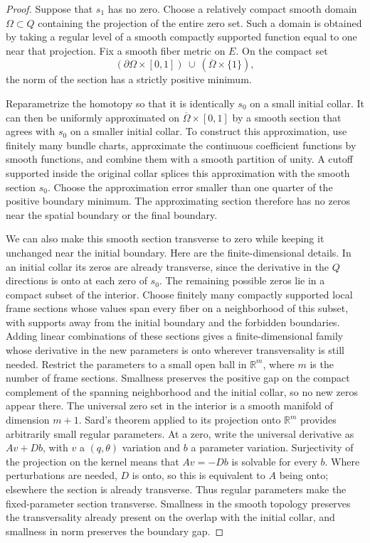 \begin{proof}
Suppose that $s_1$ has no zero.  Choose a relatively compact smooth
domain $\Omega\subset Q$ containing the projection of the entire zero
set.  Such a domain is obtained by taking a regular level of a smooth
compactly supported function equal to one near that projection.
Fix a smooth fiber metric on $E$.  On the compact set
\[
 (\partial\Omega\times[0,1])
 \ \cup\ (\overline\Omega\times\{1\}),
\]
the norm of the section has a strictly positive minimum.

Reparametrize the homotopy so that it is identically $s_0$ on a small
initial collar.  It can then be uniformly approximated on
$\overline\Omega\times[0,1]$ by a smooth section that agrees with $s_0$
on a smaller initial collar.  To construct this approximation, use
finitely many bundle charts, approximate the continuous coefficient
functions by smooth functions, and combine them with a smooth
partition of unity.  A cutoff supported inside the original collar
splices this approximation with the smooth section $s_0$.  Choose the
approximation error smaller than one quarter of the positive boundary
minimum.  The approximating section therefore has no zeros near the
spatial boundary or the final boundary.

We can also make this smooth section transverse to zero while keeping
it unchanged near the initial boundary.  Here are the finite-dimensional
details.  In an initial collar its zeros are already transverse, since
the derivative in the $Q$ directions is onto at each zero of $s_0$.
The remaining possible zeros lie in a compact subset of the interior.
Choose finitely many compactly supported local frame sections whose
values span every fiber on a neighborhood of this subset, with supports
away from the initial boundary and the forbidden boundaries.  Adding
linear combinations of these sections gives a finite-dimensional
family whose derivative in the new parameters is onto wherever
transversality is still needed. Restrict the parameters to a small open
ball in $\mathbb R^m$, where $m$ is the number of frame sections.
Smallness preserves the positive gap on the compact complement of the
spanning neighborhood and the initial collar, so no new zeros appear there.
The universal zero set in the interior is a smooth manifold of
dimension $m+1$. Sard's theorem applied to its projection onto
$\mathbb R^m$ provides arbitrarily small regular parameters. At a zero,
write the universal derivative as $Av+Db$, with $v$ a $(q,\theta)$ variation and
$b$ a parameter variation. Surjectivity of the projection on the kernel
means that $Av=-Db$ is solvable for every $b$. Where perturbations are
needed, $D$ is onto, so this is equivalent to $A$ being onto; elsewhere
the section is already transverse. Thus regular parameters make the
fixed-parameter section transverse.
Smallness in the smooth topology preserves the transversality already
present on the overlap with the initial collar, and smallness in norm
preserves the boundary gap.


\end{proof}
